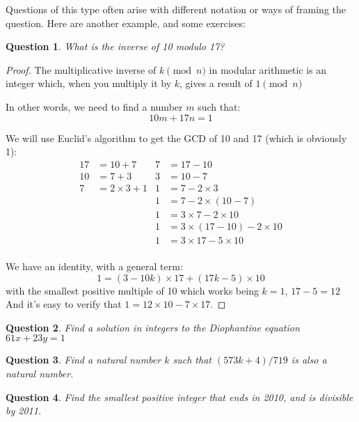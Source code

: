 \documentclass{article}
\newtheorem{question}{Question}[section]
\begin{document}
Questions of this type often arise with different notation or ways of framing the question. Here are
another example, and some exercises:

\begin{question}
What is the inverse of 10 modulo 17?
\end{question}

\begin{proof}
	The multiplicative inverse of $k \pmod{n}$ in modular arithmetic is an integer which, when you
	multiply it by $k$, gives a result of $1 \pmod{n}$

	In other words, we need to find a number $m$ such that:
	\[ 10m + 17n = 1 \]

	We will use Euclid's algorithm to get the GCD of 10 and 17 (which is obviously 1):
	\begin{align*}
		17 &= 10 + 7 & 7 &= 17 - 10 \\
		10 &= 7 + 3  & 3 &= 10 - 7 \\
		7 &= 2 \times 3 + 1 & 1 &= 7 - 2 \times 3 \\
		&& 1 &= 7 - 2 \times (10 - 7) \\
		&& 1 &= 3 \times 7 - 2 \times 10 \\
		&& 1 &= 3 \times (17 - 10) - 2 \times 10 \\
		&& 1 &= 3 \times 17 - 5 \times 10 \\
	\end{align*}
	
	We have an identity, with a general term: 
	\[ 1  = (3 - 10k) \times 17 + (17k-5) \times 10 \]
	with the smallest positive multiple of 10 which works being $k=1$, $17-5 = 12$
	And it's easy to verify that $1 = 12\times10 - 7\times17$.
\end{proof}

\begin{question}Find a solution in integers to the Diophantine equation $61x + 23y = 1$\end{question}
\vspace*{\bigskipamount}

\begin{question}Find a natural number $k$ such that $(573k+4)/719$ is also a natural
number.\end{question}
\vspace*{\bigskipamount}

\begin{question}Find the smallest positive integer that ends in 2010, and is divisible by 2011.\end{question}
\vspace*{\bigskipamount}
\end{document}
